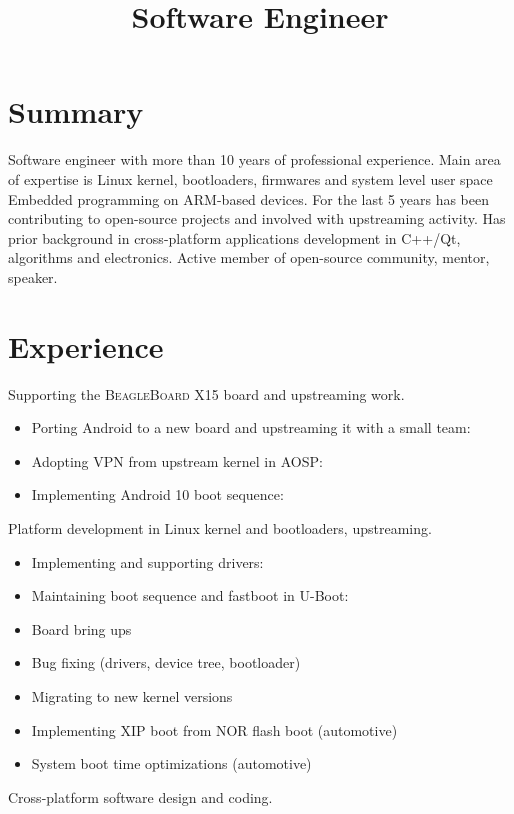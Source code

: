 \documentclass[11pt,a4paper]{moderncv}
\title{Software Engineer}
\begin{document}
\renewcommand*{\bibliographyhead}[1]{}

\maketitle

\section{Summary}

Software engineer with more than 10 years of professional experience.
Main area of expertise is Linux kernel, bootloaders, firmwares and system level
user space Embedded programming on ARM-based devices. For the last 5 years has
been contributing to open-source projects and involved with upstreaming
activity. Has prior background in cross-platform applications development in
C++/Qt, algorithms and electronics. Active member of open-source community,
mentor, speaker.

\section{Experience}
  {Supporting the \textsc{BeagleBoard X15} board and upstreaming work.
   \begin{itemize}
     \item Porting Android to a new board and upstreaming it with a small team:
           \cite{a}
     \item Adopting VPN from upstream kernel in AOSP: \cite{b}
     \item Implementing Android 10 boot sequence: \cite{c}
   \end{itemize}}
  {Platform development in Linux kernel and bootloaders, upstreaming.
   \begin{itemize}
     \item Implementing and supporting drivers: \cite{d}
     \item Maintaining boot sequence and fastboot in U-Boot: \cite{e}
     \item Board bring ups
     \item Bug fixing (drivers, device tree, bootloader)
     \item Migrating to new kernel versions
     \item Implementing XIP boot from NOR flash boot (automotive)
     \item System boot time optimizations (automotive)
   \end{itemize}
  }
  {Cross-platform software design and coding.}
\end{document}

